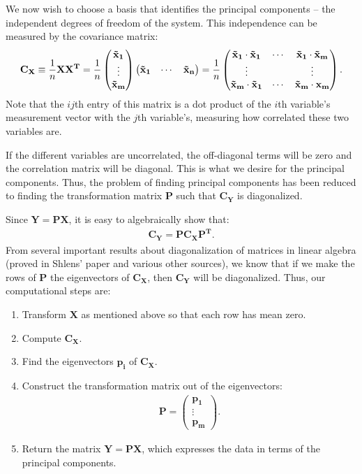 \documentclass{article}
\renewcommand{\vec}{\mathbf}
\theoremstyle{definition}
\begin{document}
We now wish to choose a basis that identifies the principal components
-- the independent degrees of freedom of the system. This independence
can be measured by the covariance matrix:
\begin{align*}
\vec{C_X} \equiv {1 \over n} \vec{X} \vec{X^T}
= 
{1 \over n}
\left(\begin{matrix}
\vec{\tilde x_1} \\
\vdots \\
\vec{\tilde x_m}
\end{matrix}\right)
\left(\begin{matrix}
\vec{\tilde x_1} & \cdots & \vec{\tilde x_n}
\end{matrix}\right)
= 
{1 \over n}
\left(\begin{matrix}
\vec{\tilde x_1} \cdot \vec{\tilde x_1} & \cdots & \vec{\tilde x_1} \cdot \vec{\tilde x_m} \\
\vdots & & \vdots \\
\vec{\tilde x_m} \cdot \vec{\tilde x_1} & \cdots & \vec{\tilde x_m} \cdot \vec{x_m}
\end{matrix}\right).
\end{align*}
Note that the $ij$th entry of this matrix is a dot product of the $i$th
variable's measurement vector with the $j$th variable's, measuring how
correlated these two variables are.

If the different variables are
uncorrelated, the off-diagonal terms will be zero and the correlation matrix
will be diagonal. This is what we desire for the principal components.
Thus, the problem of finding principal components has been reduced
to finding the transformation matrix $\vec P$ such that $\vec{C_Y}$
is diagonalized.

Since $\vec Y = \vec P \vec X$, it is easy to algebraically show that:
\begin{align*}
\vec{C_Y} = \vec P \vec{C_X} \vec{P^T}.
\end{align*}
From several important results about diagonalization of matrices
in linear algebra (proved in Shlens' paper and various other sources),
we know that if we make the rows of $\vec P$ the eigenvectors of
$\vec{C_X}$, then $\vec{C_Y}$ will be diagonalized. Thus, our computational
steps are:
\begin{enumerate}
\item Transform $\vec X$ as mentioned above so that each row has mean zero.
\item Compute $\vec{C_X}$.
\item Find the eigenvectors $\vec{p_i}$ of $\vec{C_X}$.
\item Construct the transformation matrix out of the eigenvectors:
\begin{align*}
\vec{P} = 
\left(\begin{matrix}
\vec{p_1} \\
\vdots \\
\vec{p_m}
\end{matrix}\right).
\end{align*}
\item Return the matrix $\vec Y = \vec P \vec X$, which expresses the
data in terms of the principal components.
\end{enumerate}
\end{document}
